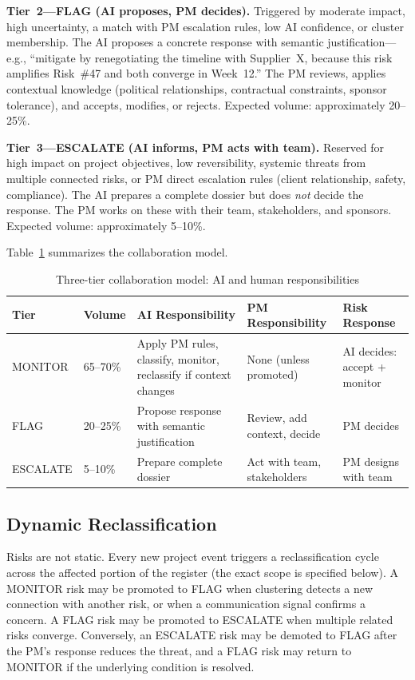 \documentclass[runningheads]{llncs}
\begin{document}
\textbf{Tier~2---FLAG (AI proposes, PM decides).} Triggered by moderate impact, high uncertainty, a match with PM escalation rules, low AI confidence, or cluster membership. The AI proposes a concrete response with semantic justification---e.g., ``mitigate by renegotiating the timeline with Supplier~X, because this risk amplifies Risk~\#47 and both converge in Week~12.'' The PM reviews, applies contextual knowledge (political relationships, contractual constraints, sponsor tolerance), and accepts, modifies, or rejects. Expected volume: approximately 20--25\%.

\textbf{Tier~3---ESCALATE (AI informs, PM acts with team).} Reserved for high impact on project objectives, low reversibility, systemic threats from multiple connected risks, or PM direct escalation rules (client relationship, safety, compliance). The AI prepares a complete dossier but does \emph{not} decide the response. The PM works on these with their team, stakeholders, and sponsors. Expected volume: approximately 5--10\%.

Table~\ref{tab:tiers} summarizes the collaboration model.

\begin{table}[htbp]
\caption{Three-tier collaboration model: AI and human responsibilities}
\label{tab:tiers}
\begin{tabularx}{\textwidth}{|p{1.8cm}|p{1.2cm}|>{\raggedright\arraybackslash}X|>{\raggedright\arraybackslash}X|>{\raggedright\arraybackslash}X|}
\hline
\textbf{Tier} & \textbf{Volume} & \textbf{AI Responsibility} & \textbf{PM Responsibility} & \textbf{Risk Response} \\
\hline
MONITOR & 65--70\% & Apply PM rules, classify, monitor, reclassify if context changes & None (unless promoted) & AI decides: accept + monitor \\
\hline
FLAG & 20--25\% & Propose response with semantic justification & Review, add context, decide & PM decides \\
\hline
ESCALATE & 5--10\% & Prepare complete dossier & Act with team, stakeholders & PM designs with team \\
\hline
\end{tabularx}
\end{table}

\subsection{Dynamic Reclassification}

Risks are not static. Every new project event triggers a reclassification cycle across the affected portion of the register (the exact scope is specified below). A MONITOR risk may be promoted to FLAG when clustering detects a new connection with another risk, or when a communication signal confirms a concern. A FLAG risk may be promoted to ESCALATE when multiple related risks converge. Conversely, an ESCALATE risk may be demoted to FLAG after the PM's response reduces the threat, and a FLAG risk may return to MONITOR if the underlying condition is resolved.
\end{document}
